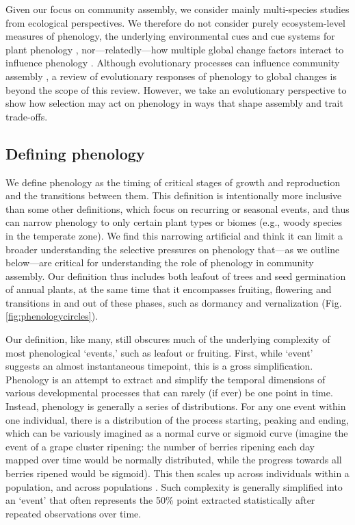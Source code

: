 \documentclass[11pt]{article}
\newcommand{\R}[1]{\label{}\linelabel{#1}}
\begin{document}
Given our focus on community assembly, we consider mainly multi-species studies from ecological perspectives. We therefore do not consider purely ecosystem-level measures of phenology, the underlying environmental cues and cue systems for plant phenology \citep[for a review see][]{chuine2017process}, nor---relatedly---how multiple global change factors interact to influence phenology \citep[e.g.][]{zhou2023climate}. Although evolutionary processes can influence community assembly \citep{cavender2019diversification}, a review of evolutionary responses of phenology to global changes is beyond the scope of this review. However, we take an evolutionary perspective to show how selection may act on phenology in ways that shape assembly and trait trade-offs.

\subsection*{Defining phenology} 

We define phenology as the timing of critical stages of growth and reproduction and the transitions between them. \R{defineS}This definition is intentionally more inclusive than some other definitions, which focus on recurring or seasonal events, and thus can narrow phenology to only certain plant types or biomes (e.g., woody species in the temperate zone). We find this narrowing artificial and think it can limit a broader understanding the selective pressures on phenology that---as we outline below---are critical for understanding the role of phenology in community assembly. Our definition thus includes both leafout of trees and seed germination of annual plants, at the same time that it encompasses fruiting, flowering and transitions in and out of these phases, such as dormancy and vernalization (Fig. \ref{fig:phenologycircles}).\R{defineE}

Our definition, like many, still obscures much of the underlying complexity of most phenological `events,' such as leafout or fruiting. First, while `event' suggests an almost instantaneous timepoint, this is a gross simplification. Phenology is an attempt to extract and simplify the temporal dimensions of various developmental processes that can rarely (if ever) be one point in time. Instead, phenology is generally a series of distributions. For any one event within one individual, there is a distribution of the process starting, peaking and ending, which can be variously imagined as a normal curve or sigmoid curve (imagine the event of a grape cluster ripening: the number of berries ripening each day mapped over time would be normally distributed, while the progress towards all berries ripened would be sigmoid). This then scales up across individuals within a population, and across populations \citep{inouye2019}. Such complexity is generally simplified into an `event' that often represents the 50\% point extracted statistically after repeated observations over time. 
\end{document}
